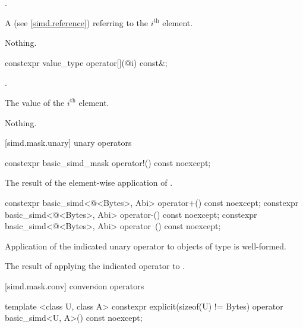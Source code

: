 \begin{itemdescr}
  \pnum\expects
  .

  \pnum\returns
  A  (see \ref{simd.reference}) referring to the $i^\text{th}$ element.

  \pnum\throws Nothing.
\end{itemdescr}

\begin{itemdecl}
constexpr value_type operator[](@\simdsizetype@ i) const&;
\end{itemdecl}

\begin{itemdescr}
  \pnum\expects
  .

  \pnum\returns
  The value of the $i^\text{th}$ element.

  \pnum\throws Nothing.
\end{itemdescr}

[simd.mask.unary]{ unary operators}

\begin{itemdecl}
constexpr basic_simd_mask operator!() const noexcept;
\end{itemdecl}

\begin{itemdescr}
  \pnum\returns
  The result of the element-wise application of .
\end{itemdescr}

\begin{itemdecl}
constexpr basic_simd<@\integerfrom@<Bytes>, Abi> operator+() const noexcept;
constexpr basic_simd<@\integerfrom@<Bytes>, Abi> operator-() const noexcept;
constexpr basic_simd<@\integerfrom@<Bytes>, Abi> operator~() const noexcept;
\end{itemdecl}

\begin{itemdescr}
  \pnum\constraints
  Application of the indicated unary operator to objects of type  is well-formed.

  \pnum\returns
  The result of applying the indicated operator to .
\end{itemdescr}

[simd.mask.conv]{ conversion operators}

\begin{itemdecl}
template <class U, class A>
  constexpr explicit(sizeof(U) != Bytes) operator basic_simd<U, A>() const noexcept;
\end{itemdecl}


